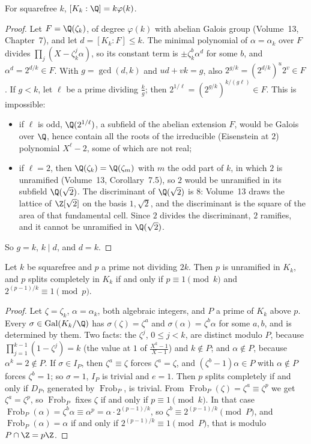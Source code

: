 \begin{lemma}\label{lem:kummerdeg}
For squarefree $k$, $[K_k:\Q]=k\varphi(k)$.
\end{lemma}
\begin{proof}
Let $F=\Q(\zeta_k)$, of degree $\varphi(k)$ with abelian Galois group (Volume~13, Chapter~7), and let $d=[K_k:F]\le k$. The minimal polynomial of $\alpha=\alpha_k$ over $F$ divides $\prod_j(X-\zeta_k^j\alpha)$, so its constant term is $\pm\zeta_k^b\alpha^d$ for some $b$, and $\alpha^d=2^{d/k}\in F$. With $g=\gcd(d,k)$ and $ud+vk=g$, also $2^{g/k}=(2^{d/k})^u2^v\in F$. If $g<k$, let $\ell$ be a prime dividing $\frac kg$; then $2^{1/\ell}=(2^{g/k})^{k/(g\ell)}\in F$. This is impossible:
\begin{itemize}
\item if $\ell$ is odd, $\Q(2^{1/\ell})$, a subfield of the abelian extension $F$, would be Galois over $\Q$, hence contain all the roots of the irreducible (Eisenstein at $2$) polynomial $X^\ell-2$, some of which are not real;
\item if $\ell=2$, then $\Q(\zeta_k)=\Q(\zeta_m)$ with $m$ the odd part of $k$, in which $2$ is unramified (Volume~13, Corollary~7.5), so $2$ would be unramified in its subfield $\Q(\sqrt2)$. The discriminant of $\Q(\sqrt2)$ is $8$: Volume~13 draws the lattice of $\Z[\sqrt2]$ on the basis $1,\sqrt2$, and the discriminant is the square of the area of that fundamental cell. Since $2$ divides the discriminant, $2$ ramifies, and it cannot be unramified in $\Q(\sqrt2)$.
\end{itemize}
So $g=k$, $k\mid d$, and $d=k$.
\end{proof}

\begin{lemma}\label{lem:kummersplit}
Let $k$ be squarefree and $p$ a prime not dividing $2k$. Then $p$ is unramified in $K_k$, and $p$ splits completely in $K_k$ if and only if $p\equiv1\pmod k$ and $2^{(p-1)/k}\equiv1\pmod p$.
\end{lemma}
\begin{proof}
Let $\zeta=\zeta_k$, $\alpha=\alpha_k$, both algebraic integers, and $P$ a prime of $K_k$ above $p$. Every $\sigma\in\operatorname{Gal}(K_k/\Q)$ has $\sigma(\zeta)=\zeta^a$ and $\sigma(\alpha)=\zeta^b\alpha$ for some $a,b$, and is determined by them. Two facts: the $\zeta^j$, $0\le j<k$, are distinct modulo $P$, because $\prod_{j=1}^{k-1}(1-\zeta^j)=k$ (the value at $1$ of $\frac{X^k-1}{X-1}$) and $k\notin P$; and $\alpha\notin P$, because $\alpha^k=2\notin P$.
If $\sigma\in I_P$, then $\zeta^a\equiv\zeta$ forces $\zeta^a=\zeta$, and $(\zeta^b-1)\alpha\in P$ with $\alpha\notin P$ forces $\zeta^b=1$; so $\sigma=1$, $I_P$ is trivial and $e=1$.
Then $p$ splits completely if and only if $D_P$, generated by $\operatorname{Frob}_P$, is trivial. From $\operatorname{Frob}_P(\zeta)=\zeta^a\equiv\zeta^p$ we get $\zeta^a=\zeta^p$, so $\operatorname{Frob}_P$ fixes $\zeta$ if and only if $p\equiv1\pmod k$. In that case $\operatorname{Frob}_P(\alpha)=\zeta^b\alpha\equiv\alpha^p=\alpha\cdot2^{(p-1)/k}$, so $\zeta^b\equiv2^{(p-1)/k}\pmod P$, and $\operatorname{Frob}_P(\alpha)=\alpha$ if and only if $2^{(p-1)/k}\equiv1\pmod P$, that is modulo $P\cap\Z=p\Z$.
\end{proof}

